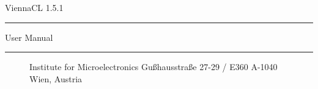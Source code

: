 
\begin{titlepage}

\vspace*{3cm}
\Huge{ViennaCL 1.5.1}
\rule[0.0cm]{9.5cm}{0.05cm}
\begin{flushright}
\Large{User Manual}
\end{flushright}

\vspace{13cm}
\rule[0.0cm]{16.0cm}{0.05cm}
\begin{figure}[!ht]
   \vspace{-1.0cm}
   \centering
   \begin{minipage}{3cm}
   \end{minipage}
   \hfill
   \hspace{-0.5cm}
   \begin{minipage}{5.5cm}
      \vspace{0.5cm}
      \begin{center}
      Institute for Microelectronics\newline
      Gu\ss hausstra\ss e 27-29 / E360\newline
      A-1040 Wien, Austria\newline
      \end{center}
   \end{minipage}
   \hfill
   \begin{minipage}{2.6cm}
   \end{minipage}
\end{figure}

\end{titlepage}

